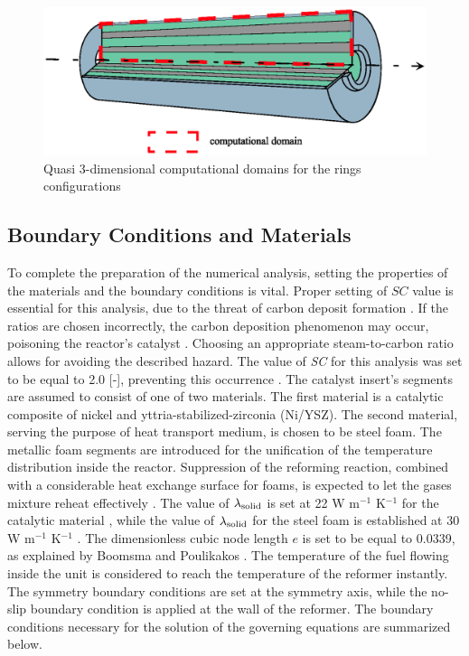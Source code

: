 \documentclass[preprint,12pt]{elsarticle}
\begin{document}
\begin{figure}[h]
\centering
\includegraphics[width=120mm]{domain.eps}\hspace{2pc} 
\caption{\label{fig:comp_domain} Quasi 3-dimensional computational domains for the rings configurations}
\end{figure}

\subsection{Boundary Conditions and Materials}
\label{sec:boundary}

To complete the preparation of the numerical analysis, setting the properties of the materials and the boundary conditions is vital. Proper setting of $\textit{SC}$ value is essential for this analysis, due to the threat of carbon deposit formation \cite{Bartholomew1982}. If the ratios are chosen incorrectly, the carbon deposition phenomenon may occur, poisoning the reactor's catalyst \cite{Lakhapatri2009}. Choosing an appropriate steam-to-carbon ratio allows for avoiding the described hazard. The value of \textit{SC} for this analysis was set to be equal to 2.0 [-], preventing this occurrence \cite{Brus2015, Tomiczek2017}. The catalyst insert's segments are assumed to consist of one of two materials. The first material is a catalytic composite of nickel and yttria-stabilized-zirconia (Ni/YSZ). The second material, serving the purpose of heat transport medium, is chosen to be steel foam. The metallic foam segments are introduced for the unification of the temperature distribution inside the reactor.  Suppression of the reforming reaction, combined with a considerable heat exchange surface for foams, is expected to let the gases mixture reheat effectively \cite{Zhao2012}. The value of $\lambda_{\rm{solid}}$ is set at 22 W m$^{-1}$ K$^{-1}$ for the catalytic material \cite{Kawashima1996}, while the value of $\lambda_{\rm{solid}}$ for the steel foam is established at 30 W m$^{-1}$ K$^{-1}$ \cite{Peet2011}. The dimensionless cubic node length $e$ is set to be equal to 0.0339, as explained by Boomsma and Poulikakos \cite{Boomsma2001}.  The temperature of the fuel flowing inside the unit is considered to reach the temperature of the reformer instantly. The symmetry boundary conditions are set at the symmetry axis, while the no-slip boundary condition is applied at the wall of the reformer. The boundary conditions necessary for the solution of the governing equations are summarized below.
\end{document}
